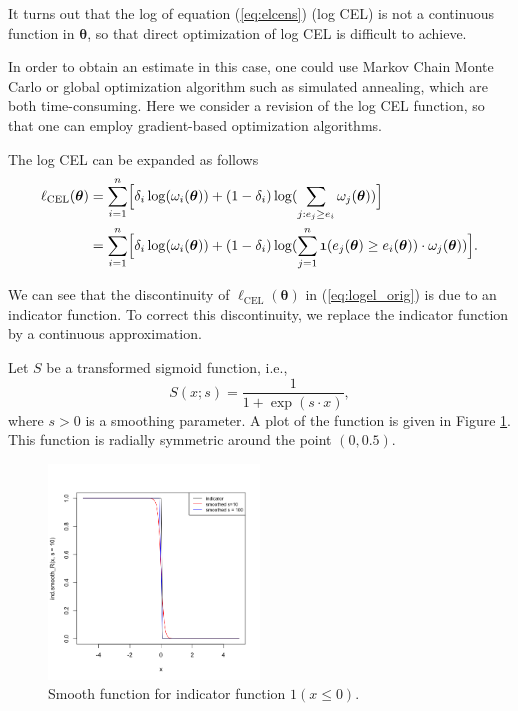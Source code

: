 \documentclass[article]{jss}
\renewcommand{\|}{\,|\,}
\begin{document}
It turns out that the log of equation (\ref{eq:elcens}) (log CEL) is not a continuous function in \(\bm \theta\), so that direct optimization of log CEL is difficult to achieve.

In order to obtain an estimate in this case, one could use Markov Chain Monte Carlo or global optimization algorithm such as simulated annealing, which are both time-consuming. Here we consider a revision of the log CEL function, so that one can employ gradient-based optimization algorithms.

The log CEL can be expanded as follows
\begin{equation}
\begin{split}
\ell_{\textrm{CEL}}(\bm \theta) &= \sum_{i=1}^n \Bigl[\delta_i\log(\omega_i(\bm \theta)) +
  (1-\delta_i)\log(\sum_{j:e_j \geq e_i} \omega_j(\bm \theta))\Bigr] \\
  &= \sum_{i=1}^n \Bigl[\delta_i\log(\omega_i(\bm \theta)) +
    (1-\delta_i)\log(\sum_{j=1}^n \mathfrak 1(e_j(\bm \theta) \geq e_i(\bm \theta)) \cdot \omega_j(\bm \theta))\Bigr].
\end{split}
\label{eq:logel_orig}
\end{equation}

We can see that the discontinuity of \(\ell_{\textrm{CEL}}(\bm \theta)\) in (\ref{eq:logel_orig}) is due to an indicator function. To correct this discontinuity, we replace the indicator function by a continuous approximation.

Let \(S\) be a transformed sigmoid function, i.e.,
\begin{equation}\label{eq:sigmoid}
  S(x; s) = \frac{1}{1+\exp(s\cdot x)},
\end{equation}
where \(s > 0\) is a smoothing parameter. A plot of the function is given in Figure \ref{fig:smoothfun}. This function is radially symmetric around the point \((0,0.5)\).

\begin{figure}[hbt!]
\centering
\includegraphics[width=0.5\textwidth]{smoothfun}
\caption{Smooth function for indicator function $\mathfrak 1(x\leq 0)$.}
\label{fig:smoothfun}
\end{figure}
\end{document}
